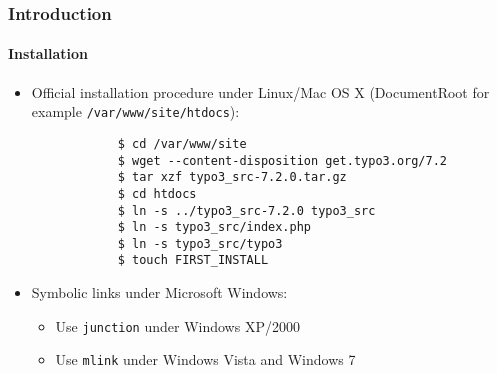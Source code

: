 \begin{frame}[fragile]
	\frametitle{Introduction}
	\framesubtitle{Installation}

	\begin{itemize}
		\item Official installation procedure under Linux/Mac OS X\newline
			(DocumentRoot for example \texttt{/var/www/site/htdocs}):
		\begin{lstlisting}
			$ cd /var/www/site
			$ wget --content-disposition get.typo3.org/7.2
			$ tar xzf typo3_src-7.2.0.tar.gz
			$ cd htdocs
			$ ln -s ../typo3_src-7.2.0 typo3_src
			$ ln -s typo3_src/index.php
			$ ln -s typo3_src/typo3
			$ touch FIRST_INSTALL
		\end{lstlisting}

		\item Symbolic links under Microsoft Windows:

			\begin{itemize}
				\item Use \texttt{junction} under Windows XP/2000
				\item Use \texttt{mlink} under Windows Vista and Windows 7
			\end{itemize}

	\end{itemize}
\end{frame}

